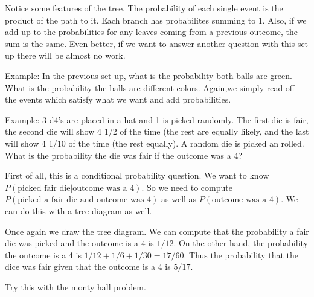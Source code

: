 \documentclass[14,fleqn]{article}
\begin{document}
Notice some features of the tree. The probability of each single event is the product of the path to it. Each branch has probabilites summing to 1. Also, if we add up to the probabilities for any leaves coming from a previous outcome, the sum is the same. Even better, if we want to answer another question with this set up there will be almost no work.

Example: In the previous set up, what is the probability both balls are green. What is the probability the balls are different colors. Again,we simply read off the events which satisfy what we want and add probabilities.

Example: 3 d4's are placed in a hat and 1 is picked randomly. The first die is fair, the second die will show 4 1/2 of the time (the rest are equally likely, and the last will show 4 1/10 of the time (the rest equally). A random die is picked an rolled. What is the probability the die was fair if the outcome was a 4?

First of all, this is a conditional probability question. We want to know $P(\text{picked fair die}|\text{outcome was a 4}).$ So we need to compute $P(\text{picked a fair die and outcome was 4})$ as well as $P(\text{outcome was a 4}).$ We can do this with a tree diagram as well.

Once again we draw the tree diagram. We can compute that the probability a fair die was picked and the outcome is a 4 is $1/12.$ On the other hand, the probability the outcome is a 4 is $1/12+1/6+1/30=17/60.$ Thus the probability that the dice was fair given that the outcome is a 4 is $5/17.$

Try this with the monty hall problem.
\end{document}
